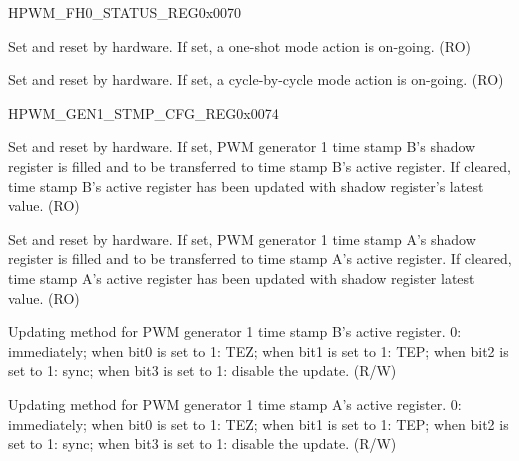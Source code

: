 \begin{register}{H}{PWM\_FH0\_STATUS\_REG}{0x0070}\label{regdesc:PWMFH0STATUSREG}
%
%
%
\regnewline%
\begin{regdesc}\begin{reglist}
\item [PWM\_FH0\_OST\_ON]Set and reset by hardware. If set, a one-shot mode action is on-going. (RO)
\item [PWM\_FH0\_CBC\_ON]Set and reset by hardware. If set, a cycle-by-cycle mode action is on-going. (RO)
\end{reglist}\end{regdesc}
\end{register}


\begin{register}{H}{PWM\_GEN1\_STMP\_CFG\_REG}{0x0074}\label{regdesc:PWMGEN1STMPCFGREG}
%
%
%
%
%
\regnewline%
\begin{regdesc}\begin{reglist}
\item [PWM\_GEN1\_B\_SHDW\_FULL]Set and reset by hardware. If set, PWM generator 1 time stamp B's shadow register is filled and to be transferred to time stamp B's active register. If cleared, time stamp B's active register has been updated with shadow register's latest value. (RO)
\item [PWM\_GEN1\_A\_SHDW\_FULL]Set and reset by hardware. If set, PWM generator 1 time stamp A's shadow register is filled and to be transferred to time stamp A's active register. If cleared, time stamp A's active register has been updated with shadow register latest value. (RO)
\item [PWM\_GEN1\_B\_UPMETHOD]Updating method for PWM generator 1 time stamp B's active register. 0: immediately; when bit0 is set to 1: TEZ; when bit1 is set to 1: TEP; when bit2 is set to 1: sync; when bit3 is set to 1: disable the update. (R/W)
\item [PWM\_GEN1\_A\_UPMETHOD]Updating method for PWM generator 1 time stamp A's active register. 0: immediately; when bit0 is set to 1: TEZ; when bit1 is set to 1: TEP; when bit2 is set to 1: sync; when bit3 is set to 1: disable the update. (R/W)
\end{reglist}\end{regdesc}
\end{register}

